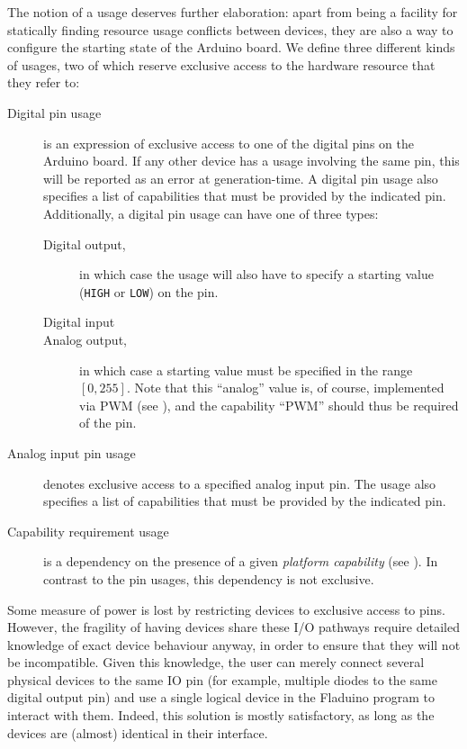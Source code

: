\documentclass[a4paper, oneside, final]{memoir}
\let\Fref\undefined
\begin{document}
The notion of a usage deserves further elaboration: apart from being a
facility for statically finding resource usage conflicts between
devices, they are also a way to configure the starting state of the
Arduino board.  We define three different kinds of usages, two of which
reserve exclusive access to the hardware resource that they refer to:

\begin{description}
\item[Digital pin usage] is an expression of exclusive access to one
  of the digital pins on the Arduino board.  If any other device has a
  usage involving the same pin, this will be reported as an error at
  generation-time.  A digital pin usage also specifies a list of
  capabilities that must be provided by the indicated pin.
  Additionally, a digital pin usage can have one of three types:
  \begin{description}
  \item[Digital output,] in which case the usage will also have to
    specify a starting value (\texttt{HIGH} or \texttt{LOW}) on the
    pin.
  \item[Digital input]
  \item[Analog output,] in which case a starting value must be
    specified in the range $[0,255]$.  Note that this ``analog'' value
    is, of course, implemented via PWM (see \Fref{sec:pwm}), and the
    capability ``PWM'' should thus be required of the pin.
  \end{description}
\item[Analog input pin usage] denotes exclusive access to a specified
  analog input pin.  The usage also specifies a list of capabilities
  that must be provided by the indicated pin.
\item[Capability requirement usage] is a dependency on the presence of
  a given \textit{platform capability} (see \Fref{sec:platforms}).  In
  contrast to the pin usages, this dependency is not exclusive.
\end{description}

Some measure of power is lost by restricting devices to exclusive
access to pins.  However, the fragility of having devices share these
I/O pathways require detailed knowledge of exact device behaviour
anyway, in order to ensure that they will not be incompatible.  Given
this knowledge, the user can merely connect several physical devices
to the same IO pin (for example, multiple diodes to the same digital
output pin) and use a single logical device in the Fladuino program to
interact with them.  Indeed, this solution is mostly satisfactory, as
long as the devices are (almost) identical in their interface.
\end{document}

